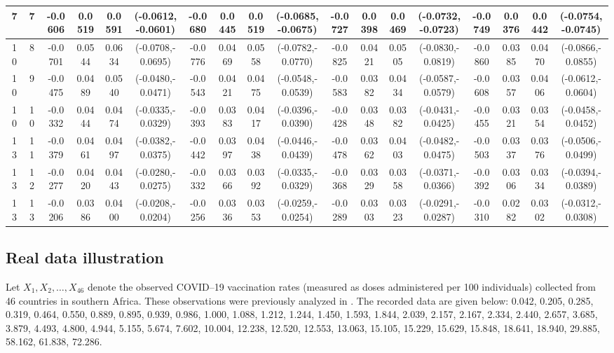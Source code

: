 \documentclass[12pt,a4paper]{article}
\numberwithin{equation}{section}
\begin{document}
\begin{table}
\begin{tabular}{cccccccccccccccccc}
7 & 7
& -0.0606 & 0.0519 & 0.0591 & (-0.0612,-0.0601)
& -0.0680 & 0.0445 & 0.0519 & (-0.0685,-0.0675)
& -0.0727 & 0.0398 & 0.0469 & (-0.0732,-0.0723)
& -0.0749 & 0.0376 & 0.0442 & (-0.0754,-0.0745) \\

\midrule

10 & 8
& -0.0701 & 0.0544 & 0.0634 & (-0.0708,-0.0695)
& -0.0776 & 0.0469 & 0.0558 & (-0.0782,-0.0770)
& -0.0825 & 0.0421 & 0.0505 & (-0.0830,-0.0819)
& -0.0860 & 0.0385 & 0.0470 & (-0.0866,-0.0855) \\

10 & 9
& -0.0475 & 0.0489 & 0.0540 & (-0.0480,-0.0471)
& -0.0543 & 0.0421 & 0.0475 & (-0.0548,-0.0539)
& -0.0583 & 0.0382 & 0.0434 & (-0.0587,-0.0579)
& -0.0608 & 0.0357 & 0.0406 & (-0.0612,-0.0604) \\

10 & 10
& -0.0332 & 0.0444 & 0.0474 & (-0.0335,-0.0329)
& -0.0393 & 0.0383 & 0.0417 & (-0.0396,-0.0390)
& -0.0428 & 0.0348 & 0.0382 & (-0.0431,-0.0425)
& -0.0455 & 0.0321 & 0.0354 & (-0.0458,-0.0452) \\

\midrule

13 & 11
& -0.0379 & 0.0461 & 0.0497 & (-0.0382,-0.0375)
& -0.0442 & 0.0397 & 0.0438 & (-0.0446,-0.0439)
& -0.0478 & 0.0362 & 0.0403 & (-0.0482,-0.0475)
& -0.0503 & 0.0337 & 0.0376 & (-0.0506,-0.0499) \\

13 & 12
& -0.0277 & 0.0420 & 0.0443 & (-0.0280,-0.0275)
& -0.0332 & 0.0366 & 0.0392 & (-0.0335,-0.0329)
& -0.0368 & 0.0329 & 0.0358 & (-0.0371,-0.0366)
& -0.0392 & 0.0306 & 0.0334 & (-0.0394,-0.0389) \\

13 & 13
& -0.0206 & 0.0386 & 0.0400 & (-0.0208,-0.0204)
& -0.0256 & 0.0336 & 0.0353 & (-0.0259,-0.0254)
& -0.0289 & 0.0303 & 0.0323 & (-0.0291,-0.0287)
& -0.0310 & 0.0282 & 0.0302 & (-0.0312,-0.0308) \\

\bottomrule
\end{tabular}
\end{table}
\subsection{Real data illustration}
Let $X_1,X_2,\ldots,X_{46}$ denote the observed COVID--19 vaccination rates (measured as doses administered per 100 individuals) collected from 46 countries in southern Africa. These observations were previously analyzed in \cite{almongy2022}. The recorded data are given below:
0.042, 0.205, 0.285, 0.319, 0.464, 0.550, 0.889, 0.895, 0.939, 0.986, 1.000, 1.088, 1.212, 1.244, 1.450, 1.593, 1.844, 2.039, 2.157, 2.167, 2.334, 2.440, 2.657, 3.685, 3.879, 4.493, 4.800, 4.944, 5.155, 5.674, 7.602, 10.004, 12.238, 12.520, 12.553, 13.063, 15.105, 15.229, 15.629, 15.848, 18.641, 18.940, 29.885, 58.162, 61.838, 72.286.
\end{document}
